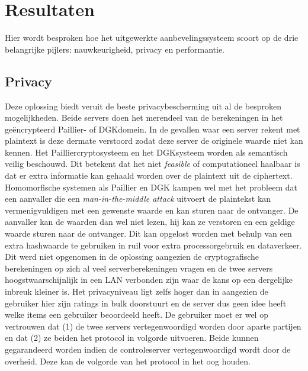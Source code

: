 \chapter{Resultaten}
Hier wordt besproken hoe het uitgewerkte aanbevelingssysteem scoort op de drie belangrijke pijlers: nauwkeurigheid, privacy en performantie.
\section{Privacy}
Deze oplossing biedt veruit de beste privacybescherming uit al de besproken mogelijkheden. Beide servers doen het merendeel van de berekeningen in het ge\"encrypteerd Paillier- of DGKdomein. In de gevallen waar een server rekent met plaintext is deze dermate verstoord zodat deze server de originele waarde niet kan kennen. Het Pailliercryptosysteem en het DGKsysteem worden als semantisch veilig beschouwd. Dit betekent dat het niet \emph{feasible} of computationeel haalbaar is dat er extra informatie kan gehaald worden over de plaintext uit de ciphertext. Homomorfische systemen als Paillier en DGK kampen wel met het probleem dat een aanvaller die een \emph{man-in-the-middle attack} uitvoert de plaintekst kan vermenigvuldigen met een gewenste waarde en kan sturen naar de ontvanger. De aanvaller kan de waarden dan wel niet lezen, hij kan ze verstoren en een geldige waarde sturen naar de ontvanger. Dit kan opgelost worden met behulp van een extra hashwaarde te gebruiken \cite{yi:homomorphic} in ruil voor extra processorgebruik en dataverkeer. Dit werd niet opgenomen in de oplossing aangezien de cryptografische berekeningen op zich al veel serverberekeningen vragen en de twee servers hoogstwaarschijnlijk in een LAN verbonden zijn waar de kans op een dergelijke inbreuk kleiner is. Het privacyniveau ligt zelfs hoger dan in \cite{ZErkinDyn} aangezien de gebruiker hier zijn ratings in bulk doorstuurt en de server dus geen idee heeft welke items een gebruiker beoordeeld heeft. De gebruiker moet er wel op vertrouwen dat (1) de twee servers vertegenwoordigd worden door aparte partijen en dat (2) ze beiden het protocol in volgorde uitvoeren. Beide kunnen gegarandeerd worden indien de controleserver vertegenwoordigd wordt door de overheid. Deze kan de volgorde van het protocol in het oog houden.
